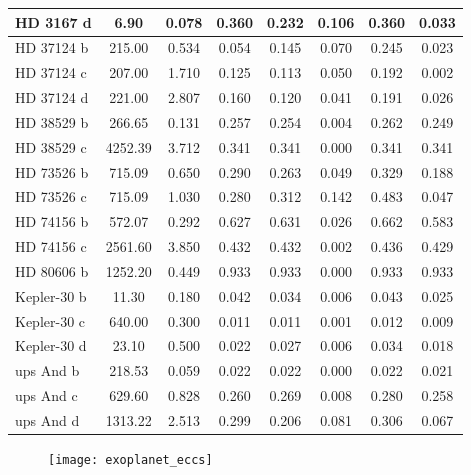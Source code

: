 \documentclass[11pt, oneside]{article}   	%
\begin{document}
\begin{longtable}{|l|c|c|c|c|c|c|c|}
HD 3167 d     & 6.90    & 0.078 & 0.360   & 0.232   & 0.106  & 0.360  & 0.033  \\ \hline
HD 37124 b    & 215.00  & 0.534 & 0.054   & 0.145   & 0.070  & 0.245  & 0.023  \\ 
HD 37124 c    & 207.00  & 1.710 & 0.125   & 0.113   & 0.050  & 0.192  & 0.002  \\ 
HD 37124 d    & 221.00  & 2.807 & 0.160   & 0.120   & 0.041  & 0.191  & 0.026  \\ \hline
HD 38529 b    & 266.65  & 0.131 & 0.257   & 0.254   & 0.004  & 0.262  & 0.249  \\ 
HD 38529 c    & 4252.39 & 3.712 & 0.341   & 0.341   & 0.000  & 0.341  & 0.341  \\ \hline
HD 73526 b    & 715.09  & 0.650 & 0.290   & 0.263   & 0.049  & 0.329  & 0.188  \\ 
HD 73526 c    & 715.09  & 1.030 & 0.280   & 0.312   & 0.142  & 0.483  & 0.047  \\ \hline
HD 74156 b    & 572.07  & 0.292 & 0.627   & 0.631   & 0.026  & 0.662  & 0.583  \\ 
HD 74156 c    & 2561.60 & 3.850 & 0.432   & 0.432   & 0.002  & 0.436  & 0.429  \\ \hline
HD 80606 b    & 1252.20 & 0.449 & 0.933   & 0.933   & 0.000  & 0.933  & 0.933  \\ \hline
Kepler-30 b   & 11.30   & 0.180 & 0.042   & 0.034   & 0.006  & 0.043  & 0.025  \\ 
Kepler-30 c   & 640.00  & 0.300 & 0.011   & 0.011   & 0.001  & 0.012  & 0.009  \\ 
Kepler-30 d   & 23.10   & 0.500 & 0.022   & 0.027   & 0.006  & 0.034  & 0.018  \\ \hline
ups And b     & 218.53  & 0.059 & 0.022   & 0.022   & 0.000  & 0.022  & 0.021  \\ 
ups And c     & 629.60  & 0.828 & 0.260   & 0.269   & 0.008  & 0.280  & 0.258  \\ 
ups And d     & 1313.22 & 2.513 & 0.299   & 0.206   & 0.081  & 0.306  & 0.067  \\ \hline
\end{longtable}



\begin{figure}[!h]
\begin{center}
\texttt{[image: exoplanet\_eccs]}
\caption[]{}
\label{}
\end{center}
\end{figure}

\newpage
\end{document}
